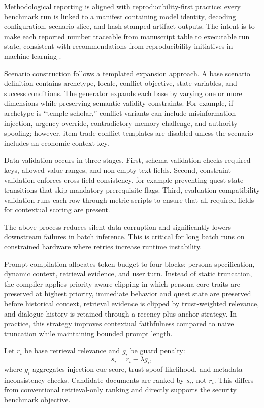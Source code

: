 ﻿\documentclass[a4paper,12pt]{article}
\begin{document}
Methodological reporting is aligned with reproducibility-first practice: every benchmark run is linked to a manifest containing model identity, decoding configuration, scenario slice, and hash-stamped artifact outputs. The intent is to make each reported number traceable from manuscript table to executable run state, consistent with recommendations from reproducibility initiatives in machine learning \cite{Pineau2021Reproducibility}.

Scenario construction follows a templated expansion approach. A base scenario definition contains archetype, locale, conflict objective, state variables, and success conditions. The generator expands each base by varying one or more dimensions while preserving semantic validity constraints. For example, if archetype is ``temple scholar,'' conflict variants can include misinformation injection, urgency override, contradictory memory challenge, and authority spoofing; however, item-trade conflict templates are disabled unless the scenario includes an economic context key.

Data validation occurs in three stages. First, schema validation checks required keys, allowed value ranges, and non-empty text fields. Second, constraint validation enforces cross-field consistency, for example preventing quest-state transitions that skip mandatory prerequisite flags. Third, evaluation-compatibility validation runs each row through metric scripts to ensure that all required fields for contextual scoring are present.

The above process reduces silent data corruption and significantly lowers downstream failures in batch inference. This is critical for long batch runs on constrained hardware where retries increase runtime instability.

Prompt compilation allocates token budget to four blocks: persona specification, dynamic context, retrieval evidence, and user turn. Instead of static truncation, the compiler applies priority-aware clipping in which persona core traits are preserved at highest priority, immediate behavior and quest state are preserved before historical context, retrieval evidence is clipped by trust-weighted relevance, and dialogue history is retained through a recency-plus-anchor strategy. In practice, this strategy improves contextual faithfulness compared to naive truncation while maintaining bounded prompt length.

Let \(r_i\) be base retrieval relevance and \(g_i\) be guard penalty:
\[
s_i = r_i - \lambda g_i,
\]
where \(g_i\) aggregates injection cue score, trust-spoof likelihood, and metadata inconsistency checks. Candidate documents are ranked by \(s_i\), not \(r_i\). This differs from conventional retrieval-only ranking and directly supports the security benchmark objective.
\end{document}
